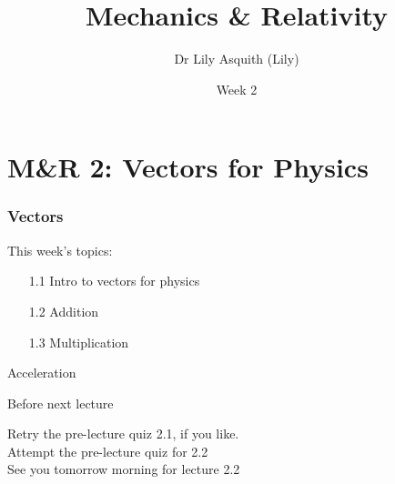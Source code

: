 


% 
\title[ Mechanics \& Relativity]{Mechanics \& Relativity}
\author[Dr Lily Asquith (Lily)]{ Dr Lily Asquith (Lily)}
\date[Week 2]{Week 2}





\begin{frame}
\titlepage
\end{frame} 

\section{M\&R 2: Vectors for Physics}
\begin{frame}
\frametitle{Vectors} 
\normalsize

This week's topics:\\[3ex]

\begin{itemize}
\item[1.1] Intro to vectors for physics\\[3ex]
\item[1.2] Addition\\[3ex]
\item[1.3] Multiplication\\[3ex]
\end{itemize}
\end{frame} 
 

\begin{frame}{Acceleration}
\small

\end{frame}


\begin{frame}{Before next lecture}

Retry the pre-lecture quiz 2.1, if you like.\\[2ex]
Attempt the pre-lecture quiz for 2.2 \\[2ex]
See you tomorrow morning for lecture 2.2\\

\end{frame}



 
